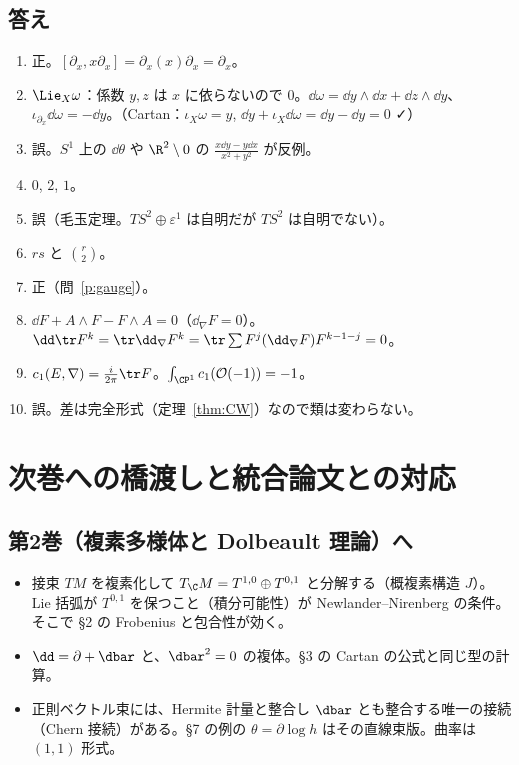 \subsection*{答え}
\begin{enumerate}[label=\textbf{A\arabic*.},leftmargin=2.4em]
\item 正。$[\partial_x,x\partial_x]=\partial_x(x)\partial_x=\partial_x$。
\item $\Lie_X\omega$：係数 $y,z$ は $x$ に依らないので $0$。$\dd\omega=\dd y\wedge\dd x+\dd z\wedge\dd y$、$\iota_{\partial_x}\dd\omega=-\dd y$。（Cartan：$\iota_X\omega=y$, $\dd y+\iota_X\dd\omega=\dd y-\dd y=0$ ✓）
\item 誤。$S^1$ 上の $\dd\theta$ や $\R^2\setminus0$ の $\frac{x\dd y-y\dd x}{x^2+y^2}$ が反例。
\item $0$, $2$, $1$。
\item 誤（毛玉定理。$TS^2\oplus\varepsilon^1$ は自明だが $TS^2$ は自明でない）。
\item $rs$ と $\binom r2$。
\item 正（問~\ref{p:gauge}）。
\item $\dd F+A\wedge F-F\wedge A=0$（$\dd_\nabla F=0$）。$\dd\tr F^k=\tr\dd_\nabla F^k=\tr\sum F^j(\dd_\nabla F)F^{k-1-j}=0$。
\item $c_1(E,\nabla)=\frac i{2\pi}\tr F$。$\int_{\CP^1}c_1(\mathcal O(-1))=-1$。
\item 誤。差は完全形式（定理~\ref{thm:CW}）なので類は変わらない。
\end{enumerate}

\section{次巻への橋渡しと統合論文との対応}
\subsection{第2巻（複素多様体と Dolbeault 理論）へ}
\begin{itemize}
\item 接束 $TM$ を複素化して $T_{\C}M=T^{1,0}\oplus T^{0,1}$ と分解する（概複素構造 $J$）。Lie 括弧が $T^{0,1}$ を保つこと（積分可能性）が Newlander--Nirenberg の条件。そこで §2 の Frobenius と包合性が効く。
\item $\dd=\partial+\dbar$ と、$\dbar^2=0$ の複体。§3 の Cartan の公式と同じ型の計算。
\item 正則ベクトル束には、Hermite 計量と整合し $\dbar$ とも整合する唯一の接続（Chern 接続）がある。§7 の例の $\theta=\partial\log h$ はその直線束版。曲率は $(1,1)$ 形式。
\end{itemize}
